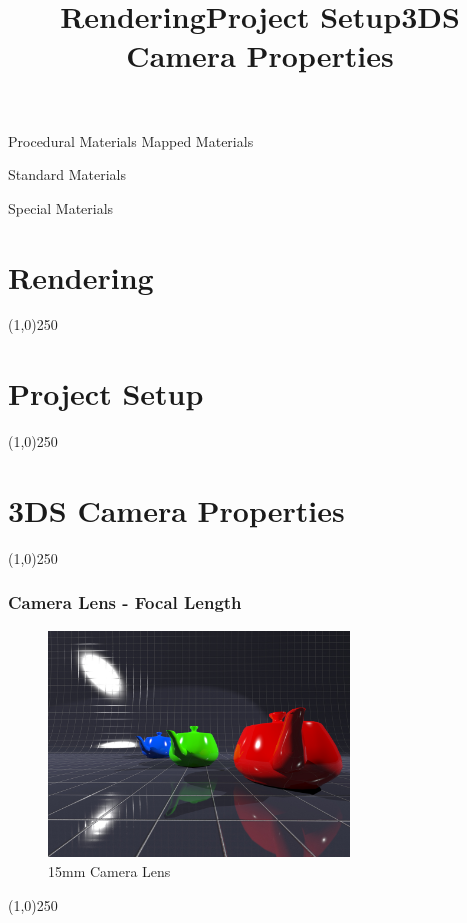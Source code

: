 Procedural Materials
Mapped Materials

Standard Materials

Special Materials








\section{Rendering}
\begin{frame}
\title[Rendering]{Rendering}
\titlepage
\end{frame}\begin{center}\line(1,0){250}\end{center}


\section{Project Setup}
\begin{frame}
\title[Project Setup]{Project Setup}
\titlepage
\end{frame}\begin{center}\line(1,0){250}\end{center}



\section{3DS Camera Properties}
\begin{frame}
\title[3DS Camera Properties]{3DS Camera Properties}
\titlepage
\end{frame}\begin{center}\line(1,0){250}\end{center}

\begin{frame}
\frametitle{Camera Lens - Focal Length}
\begin{figure}
	\centering
	\includegraphics[height=6cm]{img/Camras/15mm.jpg}
	\caption[15mm Camera Lens]{15mm Camera Lens}
	\label{fig:15mm}
\end{figure}
\end{frame}
\begin{center}\line(1,0){250}\end{center}


